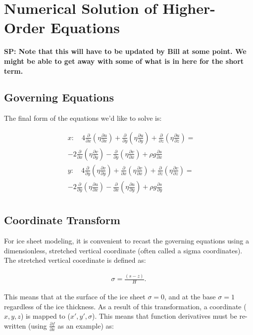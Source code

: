 
\section{Numerical Solution of Higher-Order Equations}

\textbf{SP: Note that this will have to be updated by Bill at some point. We might be able to get away with some of what is in here for the short term.}

\subsection{Governing Equations}
The final form of the equations we'd like to solve is:
 
\begin{align*}
 & x: \quad 4\frac{\partial }{\partial x}\left( \eta \frac{\partial u}{\partial x} \right)+\frac{\partial }{\partial y}\left( \eta \frac{\partial u}{\partial y} \right)+\frac{\partial }{\partial z}\left( \eta \frac{\partial u}{\partial z} \right)= \\
 &-2\frac{\partial }{\partial x}\left( \eta \frac{\partial v}{\partial y} \right)-\frac{\partial }{\partial y}\left( \eta \frac{\partial v}{\partial x} \right)+\rho g\frac{\partial s}{\partial x} \\ 
 & y: \quad 4\frac{\partial }{\partial y}\left( \eta \frac{\partial v}{\partial y} \right)+\frac{\partial }{\partial x}\left( \eta \frac{\partial v}{\partial x} \right)+\frac{\partial }{\partial z}\left( \eta \frac{\partial v}{\partial z} \right)= \\
 & -2\frac{\partial }{\partial y}\left( \eta \frac{\partial u}{\partial x} \right)-\frac{\partial }{\partial x}\left( \eta \frac{\partial u}{\partial y} \right)+\rho g\frac{\partial s}{\partial y} \\ 
\end{align*}

\subsection{Coordinate Transform}
For ice sheet modeling, it is convenient to recast the governing equations using a dimensionless, stretched vertical coordinate (often called a sigma coordinates). The stretched vertical coordinate is defined as:

\begin{align*}
\sigma = \frac{(s - z)}{H}.
\end{align*}

This means that at the surface of the ice sheet $\sigma = 0$, and at the base $\sigma = 1$ regardless of the ice thickness.  As a result of this transformation, a coordinate ($x,y,z$) is mapped to ($x',y',\sigma$).  This means that function derivatives must be re-written (using $\frac{\partial f}{\partial x}$ as an example) as:

